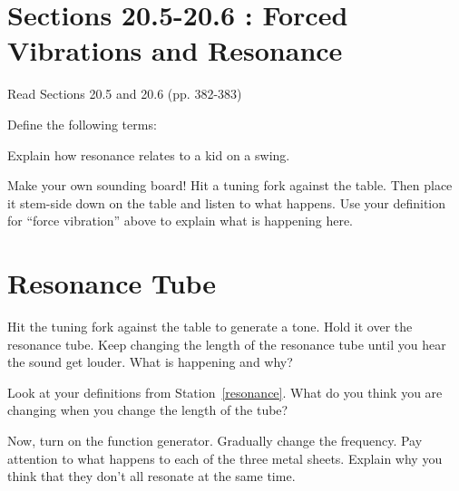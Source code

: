 \documentclass[10pt]{exam}
\begin{document}
\section{Sections 20.5-20.6 : Forced Vibrations and Resonance}

Read Sections 20.5 and 20.6 (pp. 382-383)

\begin{questions}
  \label{resonance}

  \question
    Define the following terms:


  \question
    Explain how resonance relates to a kid on a swing.

  \question
    Make your own sounding board!  Hit a tuning fork against the table.  Then place it stem-side down on the table and listen to what happens.  Use your definition for ``force vibration'' above to explain what is happening here.
  
\end{questions}

\section{Resonance Tube}

\begin{questions}
  \question
    Hit the tuning fork against the table to generate a tone.  Hold it over the resonance tube.  Keep changing the length of the resonance tube until you hear the sound get louder.  What is happening and why?

  \question
    Look at your definitions from Station~\ref{resonance}.  What do you think you are changing when you change the length of the tube?

  \question
    Now, turn on the function generator.  Gradually change the frequency.  Pay attention to what happens to each of the three metal sheets.  Explain why you think that they don't all resonate at the same time.
    
\end{questions}
\end{document}
